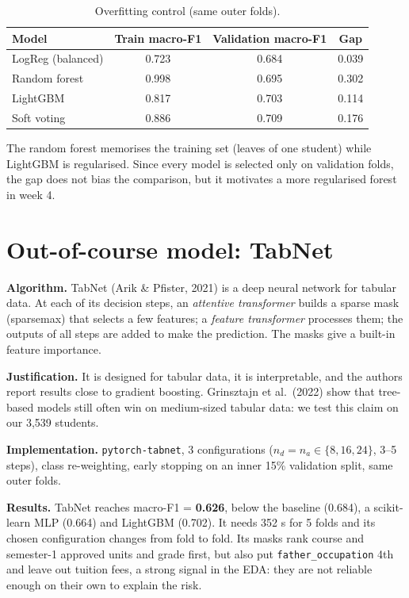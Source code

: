 \documentclass[11pt,a4paper]{article}
\begin{document}
\begin{table}[!htb]
\centering\footnotesize
\begin{tabular}{@{}lccc@{}}
\toprule
Model & Train macro-F1 & Validation macro-F1 & Gap\\
\midrule
LogReg (balanced) & 0.723 & 0.684 & 0.039\\
Random forest & 0.998 & 0.695 & 0.302\\
LightGBM & 0.817 & 0.703 & 0.114\\
Soft voting & 0.886 & 0.709 & 0.176\\
\bottomrule
\end{tabular}
\caption{Overfitting control (same outer folds).}
\label{tab:ofit}
\end{table}
The random forest memorises the training set (leaves of one student) while LightGBM is regularised. Since every model is selected only on validation folds, the gap does not bias the comparison, but it motivates a more regularised forest in week 4.

\section{Out-of-course model: TabNet}
\textbf{Algorithm.} TabNet (Arik \& Pfister, 2021) is a deep neural network for tabular data. At each of its decision steps, an \textit{attentive transformer} builds a sparse mask (sparsemax) that selects a few features; a \textit{feature transformer} processes them; the outputs of all steps are added to make the prediction. The masks give a built-in feature importance.

\textbf{Justification.} It is designed for tabular data, it is interpretable, and the authors report results close to gradient boosting. Grinsztajn et al.\ (2022) show that tree-based models still often win on medium-sized tabular data: we test this claim on our 3,539 students.

\textbf{Implementation.} \texttt{pytorch-tabnet}, 3 configurations ($n_d = n_a \in \{8, 16, 24\}$, 3--5 steps), class re-weighting, early stopping on an inner 15\% validation split, same outer folds.

\textbf{Results.} TabNet reaches macro-F1 = \textbf{0.626}, below the baseline (0.684), a scikit-learn MLP (0.664) and LightGBM (0.702). It needs 352 s for 5 folds and its chosen configuration changes from fold to fold. Its masks rank course and semester-1 approved units and grade first, but also put \texttt{father\_occupation} 4th and leave out tuition fees, a strong signal in the EDA: they are not reliable enough on their own to explain the risk.
\end{document}
